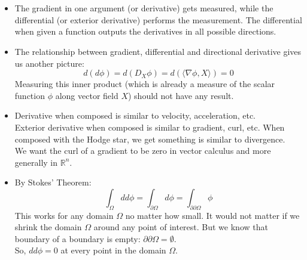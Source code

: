 \documentclass{article}
\begin{document}
\pagebreak
{}\\\\

\begin{itemize}

    \item
    The gradient in one argument (or derivative) gets measured, while the differential (or exterior derivative) performs the
    measurement. The differential when given a function outputs the derivatives in all possible directions.

    \item
    The relationship between gradient, differential and directional derivative gives us another picture:
    $$
        d(d\phi) = d(D_X\phi) = d(\langle \nabla\phi, X \rangle) = 0
    $$
    Measuring this inner product (which is already a measure of the scalar function $\phi$ along vector field $X$)
    should not have any result.

    \item
    Derivative when composed is similar to velocity, acceleration, etc.\\
    Exterior derivative when composed is similar to gradient, curl, etc.
    When composed with the Hodge star, we get something is similar to divergence.\\
    We want the curl of a gradient to be zero in vector calculus and more generally in $\mathbb{R}^n$.

    \item
    By Stokes' Theorem:
    $$
        \int_\Omega dd\phi = \int_{\partial\Omega} d\phi = \int_{\partial\partial\Omega} \phi
    $$
    This works for any domain $\Omega$ no matter how small. It would not matter if we shrink the domain $\Omega$
    around any point of interest. But we know that boundary of a boundary is empty: $\partial\partial\Omega = \emptyset$.\\
    So, $dd\phi = 0$ at every point in the domain $\Omega$.

\end{itemize}


\vspace{1.8cm}
\\\\
\end{document}
